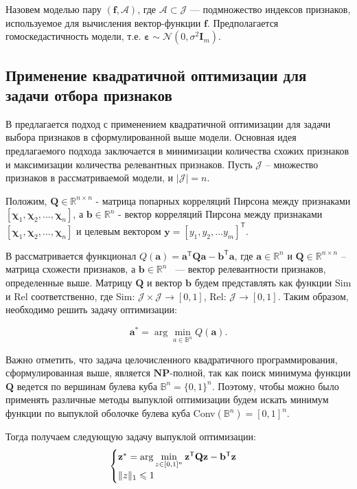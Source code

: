 \documentclass[12pt, twoside]{article}
\newcommand{\ba}{\mathbf{a}}
\newcommand{\bz}{\mathbf{z}}
\newcommand{\by}{\mathbf{y}}
\newcommand{\bfx}{\mathbf{f}}
\newcommand{\bb}{\mathbf{b}}
\newcommand{\bB}{\mathbb{B}}
\newcommand{\bJ}{\mathcal{J}}
\newcommand{\bQ}{\mathbf{Q}}
\newcommand{\bchi}{\mathbf{\chi}}
\newcommand{\beps}{\boldsymbol{\varepsilon}}
\newcommand{\getT}{^{\mathsf{T}}}
\begin{document}
Назовем моделью пару $(\bfx, \mathcal{A})$, где $\mathcal{A} \subset \bJ$ --- подмножество индексов признаков, используемое для вычисления вектор-функции $\bfx$. Предполагается гомоскедастичность модели,  т.е. $\beps \sim \mathcal{N}(0, \sigma^2 \mathbf{I}_m).$

\subsection{Применение квадратичной оптимизации для задачи отбора признаков}\label{qpfs_apply}

В \cite{qpfs_original, Katrutsa15} предлагается подход с применением квадратичной оптимизации для задачи выбора признаков в сформулированной выше модели. Основная идея предлагаемого подхода заключается в минимизации количества схожих признаков и максимизации количества релевантных признаков. Пусть $\bJ$ -- множество признаков в рассматриваемой модели, и $|\bJ| = n$. 

Положим, $\bQ \in \mathbb{R}^{n \times n}$ - матрица попарных корреляций Пирсона между признаками $[\bchi_1, \bchi_2, ..., \bchi_n]$, а $\bb \in \mathbb{R}^n$ - вектор корреляций Пирсона между признаками $[\bchi_1, \bchi_2, ..., \bchi_n]$ и целевым вектором $\by = [y_1, y_2, ... y_m]\getT$.

В \cite{Katrutsa15} рассматривается функционал $Q(\ba) = \ba \getT \bQ \ba - \bb \getT \ba$, где $\ba \in \mathbb{R}^n$ и $\bQ \in \mathbb{R}^{n \times n}$ -- матрица схожести признаков, а $\bb \in \mathbb{R}^n$ ~--- вектор релевантности признаков, определенные выше. Матрицу $\bQ$ и вектор $\bb$ будем представлять как функции Sim и Rel соответственно, где Sim: $\bJ \times \bJ \rightarrow [0, 1]$, Rel: $\bJ \rightarrow [0, 1]$. Таким образом, необходимо решить задачу оптимизации: 

$$ \ba^* = \arg \min_{a \in \bB^n} Q(\ba).$$

Важно отметить, что задача целочисленного квадратичного программирования, сформулированная выше, является $\mathbf{NP}$-полной, так как поиск минимума функции $\bQ$ ведется по вершинам булева куба $\bB^n = \{0, 1\}^n$. Поэтому, чтобы можно было применять различные методы выпуклой оптимизации будем искать минимум функции по выпуклой оболочке булева куба Conv$(\bB^n) = [0, 1]^n$. 

Тогда получаем следующую задачу выпуклой оптимизации:
\begin{equation*}
\begin{cases}
   $$ \bz^* = \arg \min_{z \in [0, 1]^n}  \bz \getT \bQ \bz - \bb \getT \bz$$  \\
   $$\|z\|_1 \le 1$$
 \end{cases}
 \end{equation*}
\end{document}
